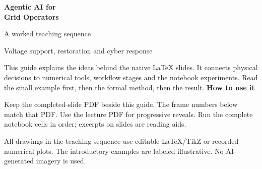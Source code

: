 \documentclass[11pt]{article}
\begin{document}
\hypersetup{pageanchor=false}
\begin{titlepage}
\par\bigskip
{\Huge\bfseries\color{navy} Agentic AI for\\Grid Operators}\par\bigskip
{\Large A worked teaching sequence}\par\medskip
Voltage support, restoration and cyber response\par\bigskip
This guide explains the ideas behind the native LaTeX slides. It connects physical decisions to numerical tools, workflow stages and the notebook experiments. Read the small example first, then the formal method, then the result.
\vfill
\textbf{How to use it}\par
Keep the completed-slide PDF beside this guide. The frame numbers below match that PDF. Use the lecture PDF for progressive reveals. Run the complete notebook cells in order; excerpts on slides are reading aids.
\par\medskip
All drawings in the teaching sequence use editable LaTeX/TikZ or recorded numerical plots. The introductory examples are labeled illustrative. No AI-generated imagery is used.
\end{titlepage}
\hypersetup{pageanchor=true}
\tableofcontents\clearpage
\end{document}
